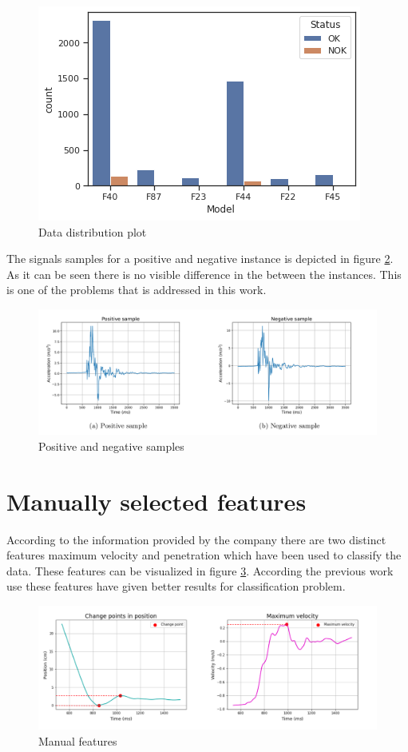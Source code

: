      \begin{figure}[h]
     	\centering
     	\includegraphics[width=0.6\linewidth]{images/barplot1.png}
     	\caption{Data distribution plot}
     	\label{n4}
     \end{figure}
   
    The signals samples for a positive and negative instance is depicted in figure \ref{n5}. As it can be seen there is no visible difference in the between the instances. This is one of the problems that is addressed in this work.
    
     \begin{figure}[h]
      	\centering
      	\includegraphics[width=1\linewidth]{images/posneg.png}
      	\caption{Positive and negative samples}
      	\label{n5}
      \end{figure}
      
      
    \section{Manually selected features}
    According to the information provided by the company there are two distinct features maximum velocity and penetration which have been used to classify the data. These features can be visualized in figure \ref{n7}. According the previous work use these features have given better results for classification problem.
    
       \begin{figure}[h]
       	\centering
       	\includegraphics[width=1\linewidth]{images/signal2.png}
       	\caption{Manual features}
       	\label{n7}
       \end{figure}
       
